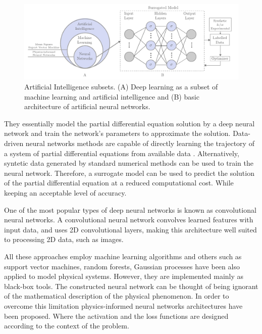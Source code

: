 \documentclass[11pt,twoside]{article}
\begin{document}
\begin{figure}[h]
\centering
    \includegraphics[width=1.0\textwidth]{figs/artificial_intelligence_subsets.pdf}
    \caption{Artificial Intelligence subsets. (A) Deep learning as a subset of machine learning and artificial 
    intelligence and (B) basic architecture of artificial neural networks.}    
    \label{deep_learning_subset_architecture}
\end{figure}

They essentially model the partial differential equation solution by a deep neural network and train the 
network’s parameters to approximate the solution. Data-driven neural networks methods are capable of directly 
learning the trajectory of a system of partial differential equations from available data 
\citep{li_neural_2020,li_fourier_2021}. Alternatively, syntetic data generated by standard numerical 
methods can be used to train the neural network. Therefore, a surrogate model can be used to predict the
solution of the partial differential equation at a reduced computational cost. While keeping an acceptable
level of accuracy.

One of the most popular types of deep neural networks is known as convolutional neural networks. A 
convolutional neural network convolves learned features with input data, and uses 2D convolutional 
layers, making this architecture well suited to processing 2D data, such as images.

All these approaches employ machine learning algorithms and others such as support vector machines, 
random forests, Gaussian processes have been also applied to model physical systems. However, they 
are implemented mainly as black-box tools. The constructed neural network can be thought of being 
ignorant of the mathematical description of the physical phenomenon. In order to overcome this 
limitation physics-informed neural networks architectures have been proposed. Where the activation 
and the loss functions are designed according to the context of the problem.
\end{document}
